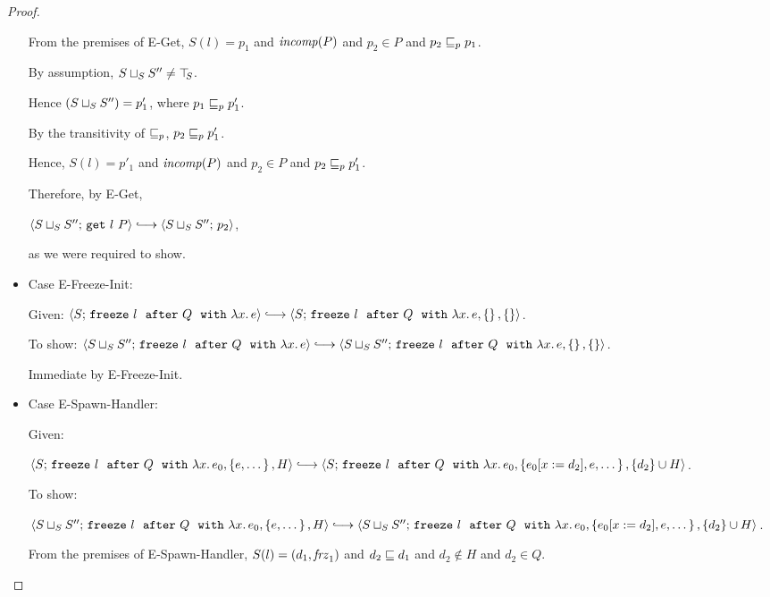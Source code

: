 \begin{proof}
\begin{itemize}
      From the premises of {\sc E-Get}, $S(l) = p_1$ and $\mathit{incomp}(P)$
      and $p_2 \in P$ and $p_2 \sqsubseteq_p p_1$.

      By assumption, $S \sqcup_{S} S'' \neq \top\hspace{-0.85mm}_{S}$.

      Hence $(S \sqcup_{S} S'') = p'_1$, where $p_1 \sqsubseteq_p p'_1$.

      By the transitivity of $\sqsubseteq_p$, $p_2 \sqsubseteq_p p'_1$.

      Hence, $S(l) = p'_1$ and $\mathit{incomp}(P)$ and $p_2 \in P$ and $p_2
      \sqsubseteq_p p'_1$.

      Therefore, by {\sc E-Get},

      $\config{\lubstore{S}{S''}}{\getexp{l}{P}} \parstepsto
      \config{\lubstore{S}{S''}}{p_2}$,

      as we were required to show.

    \item Case {\sc E-Freeze-Init}:

      Given: $\config{S}{\freezeafter{l}{Q}{\lam{x}{e}}} \parstepsto \\
      \config{S}{\freezeafterfull{l}{Q}{\lam{x}{e}}{\setof{}}{\setof{}}}$.

      To show:
      $\config{\lubstore{S}{S''}}{\freezeafter{l}{Q}{\lam{x}{e}}}
      \parstepsto \\
      \config{\lubstore{S}{S''}}{\freezeafterfull{l}{Q}{\lam{x}{e}}{\setof{}}{\setof{}}}$.

      Immediate by {\sc E-Freeze-Init}.

    \item Case {\sc E-Spawn-Handler}:

      Given:

      $\config{S}{\freezeafterfull{l}{Q}{\lam{x}{e_0}}{\setof{e,
            \dots}}{H}} \parstepsto \\
      \config{S}{\freezeafterfull{l}{Q}{\lam{x}{e_0}}{\setof{\subst{e_0}{x}{d_2},
            e, \dots}} {\{d_2\}\cup H}}$.

      To show:

      $\config{\lubstore{S}{S''}}{\freezeafterfull{l}{Q}{\lam{x}{e_0}}{\setof{e,
            \dots}}{H}} \parstepsto \\
      \config{\lubstore{S}{S''}}{\freezeafterfull{l}{Q}{\lam{x}{e_0}}{\setof{\subst{e_0}{x}{d_2},
            e, \dots}} {\{d_2\}\cup H}}$.

      From the premises of {\sc E-Spawn-Handler}, $S(l) =
      (d_1, \mathit{frz}_1)$ and $d_2 \sqsubseteq d_1$ and $d_2 \notin
      H$ and $d_2 \in Q$.


\end{itemize}
\end{proof}
